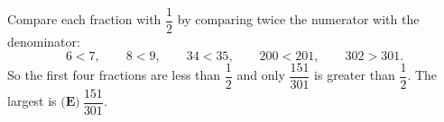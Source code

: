 Compare each fraction with $\dfrac12$ by comparing twice the numerator with the denominator:
\[6<7,\qquad8<9,\qquad34<35,\qquad200<201,\qquad302>301.\]
So the first four fractions are less than $\dfrac12$ and only $\dfrac{151}{301}$ is greater than $\dfrac12$. The largest is $\boxed{\textbf{(E)}\ \dfrac{151}{301}}$.

